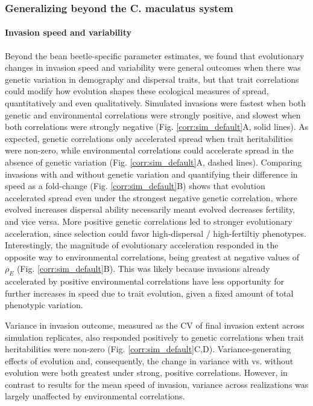 \documentclass[11pt]{article}
\newcommand{\revise}[1]{{\color{Mahogany}{#1}}}
\begin{document}
\subsubsection*{Generalizing beyond the \textup{C. maculatus} system}
\paragraph{Invasion speed and variability}
Beyond the bean beetle-specific parameter estimates, we found that evolutionary changes in invasion speed and variability were general outcomes when there was genetic variation in demography and dispersal traits, but that trait correlations could modify how evolution shapes these ecological measures of spread, quantitatively and even qualitatively.
Simulated invasions were fastest when both genetic and environmental correlations were strongly positive, and slowest when both correlations were strongly negative (Fig. \ref{corr:sim_default}A, solid lines).
As expected, genetic correlations only accelerated spread when trait heritabilities were non-zero, while environmental correlations could accelerate spread in the absence of genetic variation (Fig. \ref{corr:sim_default}A, dashed lines).
Comparing invasions with and without genetic variation and quantifying their difference in speed as a fold-change (Fig. \ref{corr:sim_default}B) shows that evolution accelerated spread even under the strongest negative genetic correlation, where evolved increases \revise{in} dispersal ability necessarily meant evolved decreases \revise{in} fertility, and vice versa.
More positive genetic correlations led to stronger evolutionary acceleration, since selection could favor high-dispersal / high-fertiltiy phenotypes.
Interestingly, the magnitude of evolutionary acceleration responded in the opposite way to environmental correlations, being greatest at negative values of $\rho_{E}$ (Fig. \ref{corr:sim_default}B).
This was likely because invasions already accelerated by positive environmental correlations have less opportunity for further increases in speed due to trait evolution, given a fixed amount of total phenotypic variation.

Variance in invasion outcome, measured as the CV of final invasion extent across simulation replicates, also responded positively to genetic correlations when trait heritabilities were non-zero (Fig. \ref{corr:sim_default}C,D).
Variance-generating effects of evolution and, consequently, the change in variance with vs. without evolution were both greatest under strong, positive correlations.
However, in contrast to results for the mean speed of invasion, variance across realizations was largely unaffected by environmental correlations.
\end{document}
